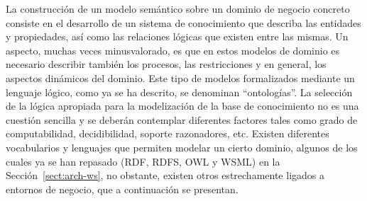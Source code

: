 La construcción de un modelo semántico sobre un dominio de negocio concreto
consiste en el desarrollo de un sistema de conocimiento que describa las
entidades y propiedades, así como las relaciones lógicas que existen entre
las mismas. Un aspecto, muchas veces minusvalorado, es que en estos modelos de
dominio es necesario describir también los procesos, las restricciones y en
general, los aspectos dinámicos del dominio. Este tipo de modelos formalizados
mediante un lenguaje lógico, como ya se ha descrito, se denominan ``ontologías''. La selección de la lógica apropiada para la modelización de 
la base de conocimiento no es una cuestión sencilla y se deberán contemplar diferentes
factores tales como grado de computabilidad, decidibilidad, soporte razonadores, etc. Existen
diferentes vocabularios y lenguajes que permiten modelar un cierto dominio, algunos
de los cuales ya se han repasado (\gls{RDF}, RDFS, \gls{OWL} y \gls{WSML}) en la Sección~\ref{sect:arch-ws}, no obstante, existen otros estrechamente
ligados a entornos de negocio, que a continuación se presentan.


